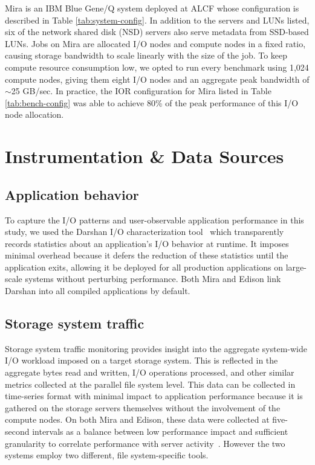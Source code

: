 Mira is an IBM Blue Gene/Q system deployed at ALCF whose configuration is described in Table \ref{tab:system-config}.
In addition to the servers and LUNs listed, six of the network shared disk (NSD) servers also serve metadata from SSD-based LUNs.
Jobs on Mira are allocated I/O nodes and compute nodes in a fixed ratio, causing storage bandwidth to scale linearly with the size of the job.
To keep compute resource consumption low, we opted to run every benchmark using 1,024 compute nodes, giving them eight I/O nodes and an aggregate peak bandwidth of $\sim$25 GB/sec.
In practice, the IOR configuration for Mira listed in Table \ref{tab:bench-config} was able to achieve 80\% of the peak performance of this I/O node allocation.

\section{Instrumentation \& Data Sources} \label{sec:methods}

\subsection{Application behavior} \label{sec:methods/darshan}

To capture the I/O patterns and user-observable application performance in this study, we used the Darshan I/O characterization tool~\cite{carns200924} which transparently records statistics about an application's I/O behavior at runtime.
It imposes minimal overhead because it defers the reduction of these statistics until the application exits,
allowing it be deployed for all production applications on large-scale systems without perturbing performance.  Both Mira and Edison link Darshan into all compiled applications by default.

\subsection{Storage system traffic} \label{sec:methods/storagesystraffic}

Storage system traffic monitoring provides insight into the aggregate system-wide I/O workload imposed on a target storage system.
This is reflected in the aggregate bytes read and written, I/O operations processed, and other similar metrics collected at the parallel file system level.
This data can be collected in time-series format with minimal impact to application performance because it is gathered on the storage servers themselves without the involvement of the compute nodes.
On both Mira and Edison, these data were collected at five-second intervals as a balance between low performance impact and sufficient granularity to correlate performance with server activity~\cite{madireddy2017}.  However the two systems employ two different, file system-specific tools.  

